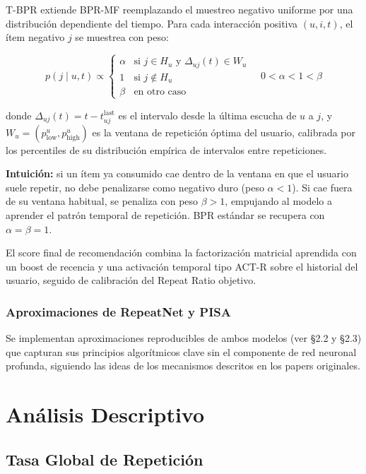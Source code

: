 \documentclass{article}
\begin{document}
T-BPR extiende BPR-MF reemplazando el muestreo negativo uniforme por una distribución dependiente del tiempo. Para cada interacción positiva \((u, i, t)\), el ítem negativo \(j\) se muestrea con peso:

\[
p(j \mid u, t) \propto \begin{cases}
\alpha & \text{si } j \in H_u \text{ y } \Delta_{uj}(t) \in W_u \\
1     & \text{si } j \notin H_u \\
\beta & \text{en otro caso}
\end{cases}
\quad 0 < \alpha < 1 < \beta
\]

donde \(\Delta_{uj}(t) = t - t_{uj}^{\text{last}}\) es el intervalo desde la última escucha de \(u\) a \(j\), y \(W_u = (p_{\text{low}}^u, p_{\text{high}}^u)\) es la ventana de repetición óptima del usuario, calibrada por los percentiles de su distribución empírica de intervalos entre repeticiones.

\textbf{Intuición:} si un ítem ya consumido cae dentro de la ventana en que el usuario suele repetir, no debe penalizarse como negativo duro (peso \(\alpha < 1\)). Si cae fuera de su ventana habitual, se penaliza con peso \(\beta > 1\), empujando al modelo a aprender el patrón temporal de repetición. BPR estándar se recupera con \(\alpha = \beta = 1\).

El score final de recomendación combina la factorización matricial aprendida con un boost de recencia y una activación temporal tipo ACT-R sobre el historial del usuario, seguido de calibración del Repeat Ratio objetivo.

\subsubsection{Aproximaciones de RepeatNet y PISA}\label{aproximaciones-de-repeatnet-y-pisa}

Se implementan aproximaciones reproducibles de ambos modelos (ver §2.2 y §2.3) que capturan sus principios algorítmicos clave sin el componente de red neuronal profunda, siguiendo las ideas de los mecanismos descritos en los papers originales.

\section{Análisis Descriptivo}\label{anuxe1lisis-descriptivo}

\subsection{Tasa Global de Repetición}\label{tasa-global-de-repeticiuxf3n}
\end{document}
